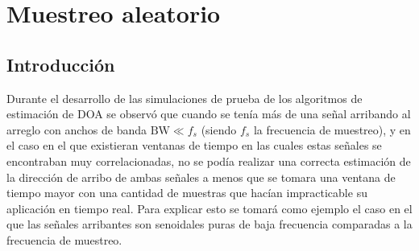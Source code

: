 \chapter{Muestreo aleatorio}\label{ch:randomsampling}

\section{Introducción}\label{subc:rs_intro}

Durante el desarrollo de las simulaciones de prueba de los algoritmos de estimación de DOA se observó que cuando se tenía más de una señal arribando al arreglo con anchos de banda $\textrm{BW}\ll f_s$ (siendo $f_s$ la frecuencia de muestreo), y en el caso en el que existieran ventanas de tiempo en las cuales estas señales se encontraban muy correlacionadas, no se podía realizar una correcta estimación de la dirección de arribo de ambas señales a menos que se tomara una ventana de tiempo mayor con una cantidad de muestras que hacían impracticable su aplicación en tiempo real. Para explicar esto se tomará como ejemplo el caso en el que las señales arribantes son senoidales puras de baja frecuencia comparadas a la frecuencia de muestreo.

